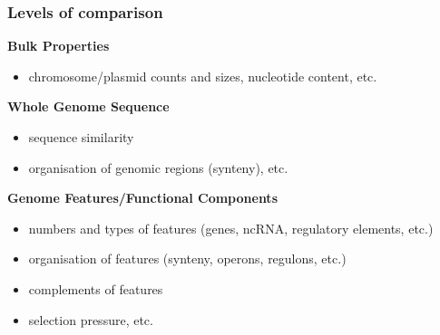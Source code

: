 
%
\begin{frame}
  \frametitle{Levels of comparison}
  \textbf{Bulk Properties} \\
  \begin{itemize}  
    \item \textcolor{hutton_green}{chromosome/plasmid counts and sizes, nucleotide content, etc.}
  \end{itemize}    
  \textbf{Whole Genome Sequence} \\
    \begin{itemize}
      \item \textcolor{hutton_blue}{sequence similarity}
      \item \textcolor{hutton_blue}{organisation of genomic regions (synteny), etc.}
    \end{itemize}
  \textbf{Genome Features/Functional Components} \\
  \begin{itemize}
    \item \textcolor{hutton_purple}{numbers and types of features (genes, ncRNA, regulatory elements, etc.)}
    \item \textcolor{hutton_purple}{organisation of features (synteny, operons, regulons, etc.)}
    \item \textcolor{hutton_purple}{complements of features}
    \item \textcolor{hutton_purple}{selection pressure, etc.}
  \end{itemize}
\end{frame}